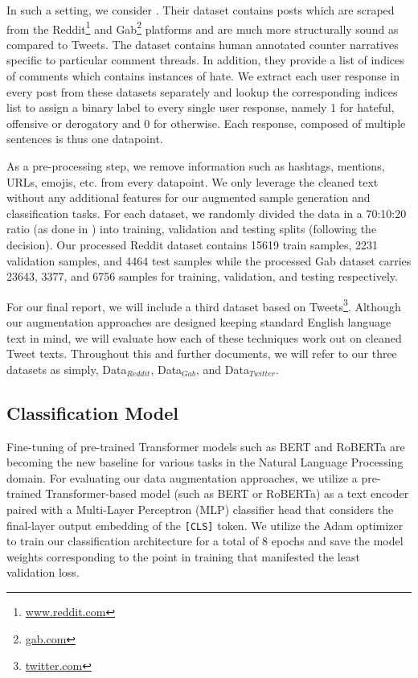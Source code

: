 \documentclass[11pt,a4paper]{article}
\begin{document}
In such a setting, we consider \citet{benchmark}. Their dataset contains posts which are scraped from the Reddit\footnote{\url{www.reddit.com}} and Gab\footnote{\url{gab.com}} platforms and are much more structurally sound as compared to Tweets. The dataset contains human annotated counter narratives specific to particular comment threads. In addition, they provide a list of indices of comments which contains instances of hate. We extract each user response in every post from these datasets separately and lookup the corresponding indices list to assign a binary label to every single user response, namely 1 for hateful, offensive or derogatory and 0 for otherwise. Each response, composed of multiple sentences is thus one datapoint.

As a pre-processing step, we remove information such as hashtags, mentions, URLs, emojis, etc. from every datapoint. We only leverage the cleaned text without any additional features for our augmented sample generation and classification tasks. For each dataset, we randomly divided the data in a 70:10:20 ratio (as done in \citet{benchmark}) into training, validation and testing splits (following the decision). Our processed Reddit dataset contains 15619 train samples, 2231 validation samples, and 4464 test samples while the processed Gab dataset carries 23643, 3377, and 6756 samples for training, validation, and testing respectively.

For our final report, we will include a third dataset based on Tweets\footnote{\url{twitter.com}}. Although our augmentation approaches are designed keeping standard English language text in mind, we will evaluate how each of these techniques work out on cleaned Tweet texts. Throughout this and further documents, we will refer to our three datasets as simply, Data$_{Reddit}$, Data$_{Gab}$, and Data$_{Twitter}$.

\subsection{Classification Model}

Fine-tuning of pre-trained Transformer models such as BERT \cite{devlin2018bert} and RoBERTa \cite{roberta} are becoming the new baseline for various tasks in the Natural Language Processing domain. For evaluating our data augmentation approaches, we utilize a pre-trained Transformer-based model (such as BERT or RoBERTa) as a text encoder paired with a Multi-Layer Perceptron (MLP) classifier head that considers the final-layer output embedding of the \texttt{[CLS]} token. We utilize the Adam optimizer to train our classification architecture for a total of 8 epochs and save the model weights corresponding to the point in training that manifested the least validation loss.
\end{document}
